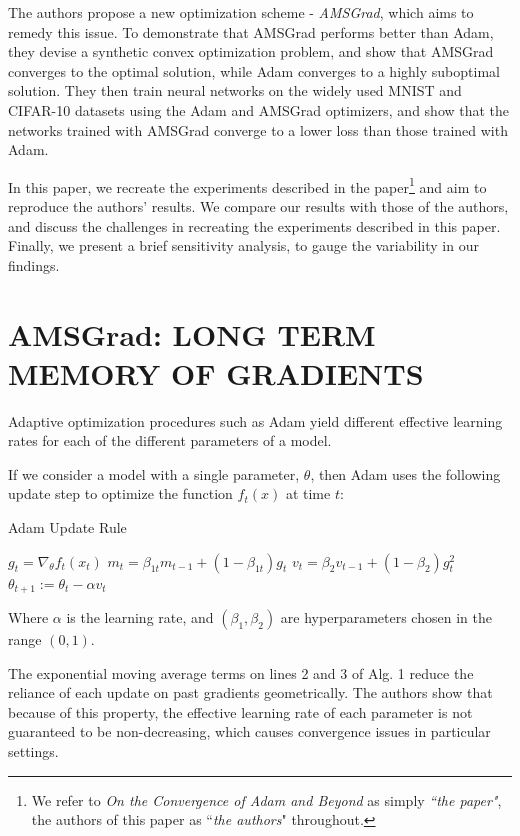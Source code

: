 \documentclass[letterpaper, 10 pt, conference]{ieeeconf}  %
\begin{document}
The authors propose a new optimization scheme - \emph{AMSGrad}, which aims to remedy this issue. To demonstrate that AMSGrad performs better than Adam, they devise a synthetic convex optimization problem, and show that AMSGrad converges to the optimal solution, while Adam converges to a highly suboptimal solution. They then train neural networks on the widely used MNIST and CIFAR-10 datasets using the Adam and AMSGrad optimizers, and show that the networks trained with AMSGrad converge to a lower loss than those trained with Adam. 

In this paper, we recreate the experiments described in the paper\footnote{We refer to \emph{On the Convergence of Adam and Beyond} as simply \emph{``the paper"}, the authors of this paper as ``\emph{the authors}" throughout.} and aim to reproduce the authors' results. We compare our results with those of the authors, and discuss the challenges in recreating the experiments described in this paper. Finally, we present a brief sensitivity analysis, to gauge the variability in our findings.

\section{AMSGrad: LONG TERM MEMORY OF GRADIENTS}

Adaptive optimization procedures such as Adam yield different effective learning rates for each of the different parameters of a model.

If we consider a model with a single parameter, $\theta$, then Adam uses the following update step to optimize the function $f_{t}(x)$ at time $t$:

\begin{algorithm}
\caption{Adam Update Rule}\label{Adam-update}
\begin{algorithmic}[1]
\State $g_t = \nabla_{\theta}f_t(x_t)$
\State $m_t = \beta_{1t}m_{t-1} + (1 - \beta_{1t})g_t$ 
\State $v_t = \beta_2{v_{t-1}} + (1-\beta_2)g_t^2$
\State $\theta_{t + 1} := \theta_t - \alpha{v_t}$
\end{algorithmic}
\end{algorithm}
Where $\alpha$ is the learning rate, and $(\beta_1, \beta_2)$ are hyperparameters chosen in the range $(0,1)$.

The exponential moving average terms on lines 2 and 3 of Alg. 1 reduce the reliance of each update on past gradients geometrically. The authors show that because of this property, the effective learning rate of each parameter is not guaranteed to be non-decreasing, which causes convergence issues in particular settings. 
\end{document}
